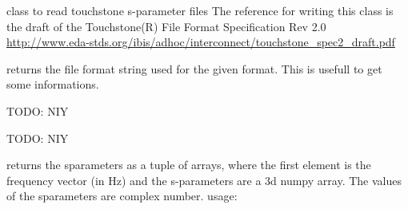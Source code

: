 \documentclass[letterpaper,10pt,english]{sphinxmanual}
\begin{document}
\begin{fulllineitems}
\label{api/mwavepy:mwavepy.touchstone.touchstone}
class to read touchstone s-parameter files
The reference for writing this class is the draft of the
Touchstone(R) File Format Specification Rev 2.0
\href{http://www.eda-stds.org/ibis/adhoc/interconnect/touchstone\_spec2\_draft.pdf}{http://www.eda-stds.org/ibis/adhoc/interconnect/touchstone\_spec2\_draft.pdf}

\begin{fulllineitems}
\label{api/mwavepy:mwavepy.touchstone.touchstone.get_format}
returns the file format string used for the given format.
This is usefull to get some informations.

\end{fulllineitems}


\begin{fulllineitems}
\label{api/mwavepy:mwavepy.touchstone.touchstone.get_noise_data}
TODO: NIY

\end{fulllineitems}


\begin{fulllineitems}
\label{api/mwavepy:mwavepy.touchstone.touchstone.get_noise_names}
TODO: NIY

\end{fulllineitems}


\begin{fulllineitems}
\label{api/mwavepy:mwavepy.touchstone.touchstone.get_sparameter_arrays}
returns the sparameters as a tuple of arrays, where the first element is
the frequency vector (in Hz) and the s-parameters are a 3d numpy array.
The values of the sparameters are complex number.
usage:
\begin{quote}


\end{quote}
\end{fulllineitems}
\end{fulllineitems}
\end{document}

